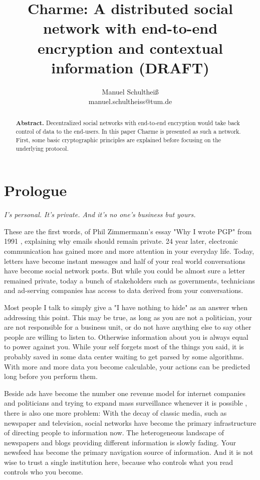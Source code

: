 \documentclass{scrartcl}
\title{Charme: A distributed social network with end-to-end encryption and contextual information (DRAFT)}
\author{Manuel Schultheiß\\manuel.schultheiss@tum.de}
\begin{document}
  \sloppy %
 
\maketitle

\begin{abstract}
\noindent
  \textbf{Abstract.} 
  Decentralized social networks with end-to-end encryption would take back control of data to the end-users. In this paper Charme is presented as such a network. First, some  basic cryptographic  principles are explained before focusing on the underlying  protocol.
  \end{abstract}
  
  
\tableofcontents
 \newpage
\section{Prologue}

\begin{center}
\textit{I's personal. It's private.
And it's no one's business but yours.}
\end{center}

These are the first words, of Phil Zimmermann's essay "Why I wrote PGP" from 1991 \cite{PHIL}, explaining why emails should remain private. 24 year later, electronic communication has gained more and more attention in your everyday life. Today, letters have become instant messages and half of your real world conversations have become social network posts. But while you could be almost sure a letter remained private, today a bunch of stakeholders such as governments, technicians and ad-serving companies has access to data derived from your conversations. 


Most people I talk to simply give a "I have nothing to hide" as an answer when addressing this point. This may be true, as long as you are not a politician, your are not responsible for a business unit, or do not have anything else to say other people are willing to listen to. Otherwise information about you is always equal to power against you. While your self forgets most of the things you said, it is probably saved in some data center waiting to get parsed by some algorithms. With more and more data you become calculable, your actions can be predicted long before you perform them.


Beside ads have become the number one revenue model for internet companies and politicians and trying to expand mass surveillance  whenever it is possible \cite{EFF}, there is also one more problem: With the decay of classic media, such as newspaper and television, social networks have become the primary infrastructure of directing people to information now. The heterogeneous  landscape of newspapers and blogs providing different information is slowly fading. Your newsfeed has become the primary navigation source of information. And it is not  wise to trust a single institution  here, because who controls what you read controls who you become.
\end{document}
